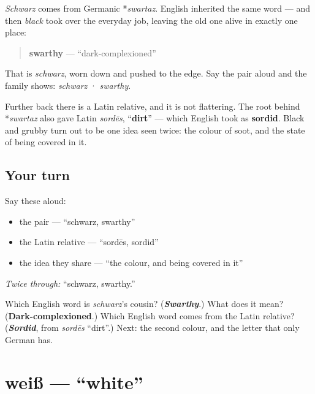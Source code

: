 \begin{cousinweb}
\emph{Schwarz} comes from Germanic *\emph{swartaz}. English inherited the same word — and then \emph{black} took over the everyday job, leaving the old one alive in exactly one place:

\begin{quote}
\textbf{swarthy} — \textquotedblleft{}dark-complexioned\textquotedblright{}
\end{quote}

That is \emph{schwarz}, worn down and pushed to the edge. Say the pair aloud and the family shows: \emph{schwarz} · \emph{swarthy}.

Further back there is a Latin relative, and it is not flattering. The root behind *\emph{swartaz} also gave Latin \emph{sordēs}, \textquotedblleft{}\textbf{dirt}\textquotedblright{} — which English took as \textbf{sordid}. Black and grubby turn out to be one idea seen twice: the colour of soot, and the state of being covered in it.
\end{cousinweb}

\subsection*{Your turn}
Say these aloud:

\begin{itemize}
\raggedright
  \item the pair — \textquotedblleft{}schwarz, swarthy\textquotedblright{}
  \item the Latin relative — \textquotedblleft{}sordēs, sordid\textquotedblright{}
  \item the idea they share — \textquotedblleft{}the colour, and being covered in it\textquotedblright{}
\end{itemize}

\emph{Twice through:} \textquotedblleft{}schwarz, swarthy.\textquotedblright{}

\begin{tcolorbox}[breakable,colback=teal!4,colframe=teal!35!black,title={Before you move on}]
Which English word is \emph{schwarz}'s cousin? (\emph{\textbf{Swarthy}}.) What does it mean? (\textbf{Dark-complexioned}.) Which English word comes from the Latin relative? (\emph{\textbf{Sordid}}, from \emph{sordēs} \textquotedblleft{}dirt\textquotedblright{}.) Next: the second colour, and the letter that only German has.
\end{tcolorbox}
\section[weiß]{weiß — \textquotedblleft{}white\textquotedblright{}}

